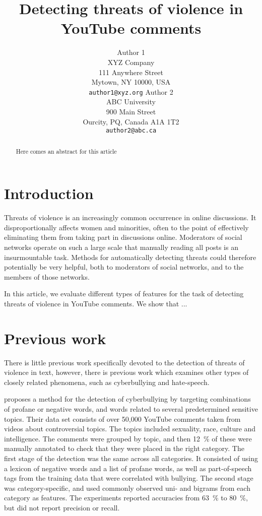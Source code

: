 \documentclass[11pt,letterpaper]{article}
\title{Detecting threats of violence in YouTube comments}
\author{Author 1\\
	    XYZ Company\\
	    111 Anywhere Street\\
	    Mytown, NY 10000, USA\\
	    {\tt author1@xyz.org}
	  \And
	Author 2\\
  	ABC University\\
  	900 Main Street\\
  	Ourcity, PQ, Canada A1A 1T2\\
  {\tt author2@abc.ca}}
\date{}
\begin{document}
\maketitle

\begin{abstract}
Here comes an abstract for this article
\end{abstract}

\section{Introduction}
\label{sec:intro}
Threats of violence is an increasingly common occurrence in online
discussions. It disproportionally affects women and minorities, often
to the point of effectively eliminating them from taking part in
discussions online. Moderators of social networks operate on such a
large scale that manually reading all posts is an insurmountable
task. Methods for automatically detecting threats could therefore
potentially be very helpful, both to moderators of social networks,
and to the members of those networks.

In this article, we evaluate different types of features for the task
of detecting threats of violence in YouTube comments. We show that ...

\section{Previous work}
\label{sec:prev}
There is little previous work specifically devoted to the detection of
threats of violence in text, however, there is previous work which
examines other types of closely related phenomena, such as
cyberbullying and hate-speech.

 proposes a method for the detection of
cyberbullying by targeting combinations of profane or negative words,
and words related to several predetermined sensitive topics. Their
data set consists of over 50,000 YouTube comments taken from videos
about controversial topics. The topics included sexuality, race,
culture and intelligence. The comments were grouped by topic, and then
12~\% of these were manually annotated to check that they were placed
in the right category.
The first stage of the detection was the same across all
categories. It consisted of using a lexicon of negative words and a
list of profane words, as well as part-of-speech tags from the
training data that were correlated with bullying. The second stage was
category-specific, and used commonly observed uni- and bigrams from
each category as features. The experiments reported accuracies from
63~\% to 80~\%, but did not report precision or recall.
\end{document}
